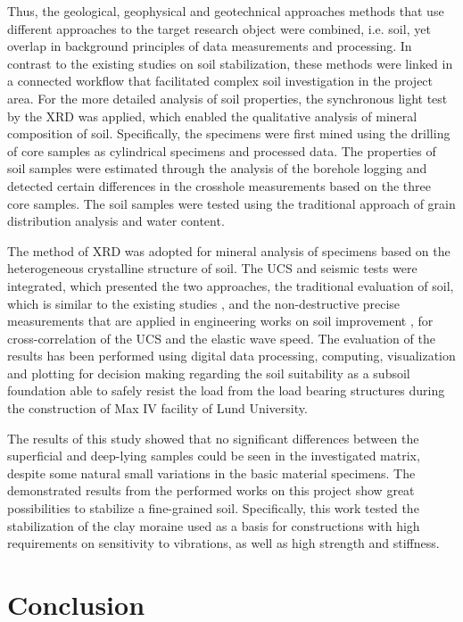 \documentclass[USenglish,twocolumn]{article}
\begin{document}
Thus, the geological, geophysical and geotechnical approaches methods that use different approaches to the target research object were combined, i.e. soil, yet overlap in background principles of data measurements and processing. In contrast to the existing studies on soil stabilization, these methods were linked in a connected workflow that facilitated complex soil investigation in the project area. For the more detailed analysis of soil properties, the synchronous light test by the XRD was applied, which enabled the qualitative analysis of mineral composition of soil. Specifically, the specimens were first mined using the drilling of core samples as cylindrical specimens and processed data. The properties of soil samples were estimated through the analysis of the borehole logging and detected certain differences in the crosshole measurements based on the three core samples. The soil samples were tested using the traditional approach of grain distribution analysis and water content. 

The method of XRD was adopted for mineral analysis of specimens based on the heterogeneous crystalline structure of soil. The UCS and seismic tests were integrated, which presented the two approaches, the traditional evaluation of soil, which is similar to the existing studies \cite{Yilmaz}, and the non-destructive precise measurements that are applied in engineering works on soil improvement \cite{Staab,Madhyannapu}, for cross-correlation of the UCS and the elastic wave speed. The evaluation of the results has been performed using digital data processing, computing, visualization and plotting for decision making regarding the soil suitability as a subsoil foundation able to safely resist the load from the load bearing structures during the construction of Max IV facility of Lund University. 

The results of this study showed that no significant differences between the superficial and deep-lying samples could be seen in the investigated matrix, despite some natural small variations in the basic material specimens. The demonstrated results from the performed works on this project show great possibilities to stabilize a fine-grained soil. Specifically, this work tested the stabilization of the clay moraine used as a basis for constructions  with high requirements on sensitivity to vibrations, as well as high strength and stiffness.

\section{Conclusion}\label{sec:7}
\end{document}
